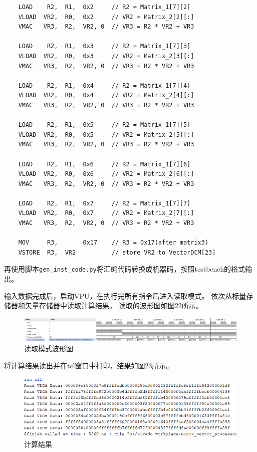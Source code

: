 \documentclass[UTF8]{ctexart}
\begin{document}
\begin{lstlisting}
    LOAD    R2,  R1,  0x2     // R2 = Matrix_1[7][2]
    VLOAD  VR2,  R0,  0x2     // VR2 = Matrix_2[2][:]
    VMAC   VR3,  R2,  VR2, 0  // VR3 = R2 * VR2 + VR3

    LOAD    R2,  R1,  0x3     // R2 = Matrix_1[7][3]
    VLOAD  VR2,  R0,  0x3     // VR2 = Matrix_2[3][:]
    VMAC   VR3,  R2,  VR2, 0  // VR3 = R2 * VR2 + VR3

    LOAD    R2,  R1,  0x4     // R2 = Matrix_1[7][4]
    VLOAD  VR2,  R0,  0x4     // VR2 = Matrix_2[4][:]
    VMAC   VR3,  R2,  VR2, 0  // VR3 = R2 * VR2 + VR3

    LOAD    R2,  R1,  0x5     // R2 = Matrix_1[7][5]
    VLOAD  VR2,  R0,  0x5     // VR2 = Matrix_2[5][:]
    VMAC   VR3,  R2,  VR2, 0  // VR3 = R2 * VR2 + VR3

    LOAD    R2,  R1,  0x6     // R2 = Matrix_1[7][6]
    VLOAD  VR2,  R0,  0x6     // VR2 = Matrix_2[6][:]
    VMAC   VR3,  R2,  VR2, 0  // VR3 = R2 * VR2 + VR3

    LOAD    R2,  R1,  0x7     // R2 = Matrix_1[7][7]
    VLOAD  VR2,  R0,  0x7     // VR2 = Matrix_2[7][:]
    VMAC   VR3,  R2,  VR2, 0  // VR3 = R2 * VR2 + VR3

    MOV     R3,       0x17    // R3 = 0x17(after matrix3)
    VSTORE  R3,  VR2          // store VR2 to VectorDCM[23]

\end{lstlisting}

再使用脚本\verb|gen_inst_code.py|将汇编代码转换成机器码，按照testbench的格式输出。

输入数据完成后，启动VPU，在执行完所有指令后进入读取模式。
依次从标量存储器和矢量存储器中读取计算结果。
读取的波形图如图22所示。

\begin{figure}[htbp]
    \centering
    \includegraphics[width=16cm]{pic/read_wfm.png}
    \caption{读取模式波形图}
\end{figure}

将计算结果读出并在tcl窗口中打印，结果如图23所示。

\begin{figure}[htbp]
    \centering
    \includegraphics[width=16cm]{pic/matrix_result.png}
    \caption{计算结果}
\end{figure}
\end{document}
